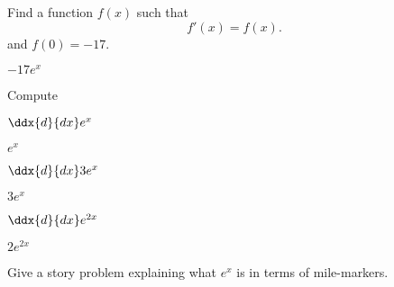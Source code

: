\documentclass{ximera}
\begin{document}
\begin{question}
  Find a function $f(x)$ such that
  \[
  f'(x) = f(x).
  \]
  and $f(0) = -17$.
  \begin{answer}
    $-17e^x$
  \end{answer}
\end{question}


\begin{question}
  Compute
  \begin{rotate}
    $\ddx{d}{dx} e^x$
    \begin{answer}
      $e^x$
    \end{answer}
    \pause
    $\ddx{d}{dx} 3e^x$
    \begin{answer}
      $3e^x$
    \end{answer}
    \pause
    $\ddx{d}{dx} e^{2x}$
    \begin{answer}
      $2e^{2x}$
    \end{answer}
  \end{rotate}
\end{question}


\begin{question}
  Give a story problem explaining what $e^x$ is in terms of
  mile-markers.
  \begin{answer}
  \end{answer}
\end{question}
\end{document}
